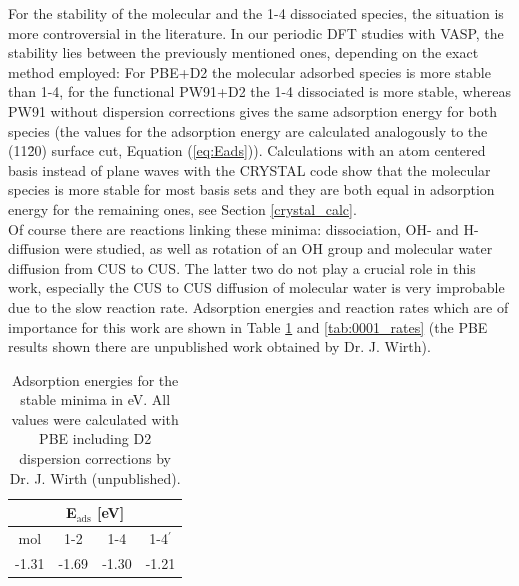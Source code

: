 \documentclass[11pt,DIV=13,BCOR=5mm,a4paper,headinclude]{scrbook}
\begin{document}
For the stability of the molecular and the 1-4 dissociated species, the situation is more controversial in the literature\cite{WirthJPCC2012,hass00,Ranea2009}.
In our periodic DFT studies with VASP, the stability lies between the previously mentioned ones, depending on the exact method employed: For PBE+D2 the molecular adsorbed species is more stable than 1-4, for the functional PW91+D2 the 1-4 dissociated is more stable, whereas PW91 without dispersion corrections gives the same adsorption energy for both species (the values for the adsorption energy are calculated analogously to the (11\=20) surface cut, Equation (\ref{eq:Eads})).
Calculations with an atom centered basis instead of plane waves with the CRYSTAL code show that the molecular species is more stable for most basis sets and they are both equal in adsorption energy for the remaining ones, see Section \ref{crystal_calc}.
\\
Of course there are reactions linking these minima: dissociation, OH- and H-diffusion were studied, as well as rotation of an OH group and molecular water diffusion from CUS to CUS.
The latter two do not play a crucial role in this work, especially the CUS to CUS diffusion of molecular water is very improbable due to the slow reaction rate.
Adsorption energies and reaction rates which are of importance for this work are shown in Table \ref{tab:0001_eads} and \ref{tab:0001_rates} (the PBE results shown there are unpublished work obtained by Dr. J. Wirth).
\begin{table}[!h]
  \centering
   \caption{Adsorption energies for the stable minima in eV.
All values were calculated with PBE including D2 dispersion corrections by Dr. J. Wirth (unpublished).}
  \begin{tabular}{cccc}
  \toprule
   \multicolumn{4}{c}{E$_\textrm{ads}$ [eV]}\\\midrule
  mol &1-2 &1-4 &1-4$^\prime$  \\
  -1.31 & -1.69 & -1.30 & -1.21\\\bottomrule
    \end{tabular}
  \label{tab:0001_eads}
\end{table}
\end{document}
